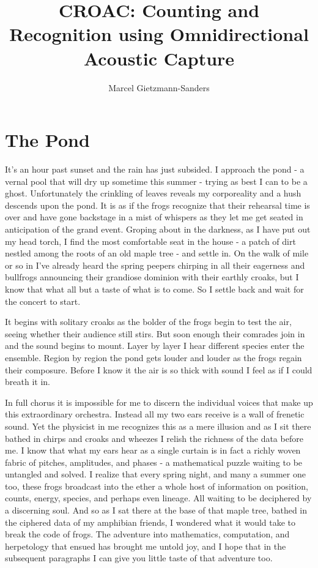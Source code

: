 \documentclass[10pt,a4paper]{article}
\title{CROAC: Counting and Recognition using Omnidirectional Acoustic Capture}
\author{Marcel Gietzmann-Sanders}
\begin{document}
\maketitle
\section{The Pond}
It's an hour past sunset and the rain has just subsided. I approach the pond - a vernal pool that will dry up sometime this summer - trying as best I can to be a ghost. Unfortunately the crinkling of leaves reveals my corporeality and a hush descends upon the pond. It is as if the frogs recognize that their rehearsal time is over and have gone backstage in a mist of whispers as they let me get seated in anticipation of the grand event. Groping about in the darkness, as I have put out my head torch, I find the most comfortable seat in the house - a patch of dirt nestled among the roots of an old maple tree - and settle in. On the walk of mile or so in I've already heard the spring peepers chirping in all their eagerness and bullfrogs announcing their grandiose dominion with their earthly croaks, but I know that what all but a taste of what is to come. So I settle back  and wait for the concert to start.

It begins with solitary croaks as the bolder of the frogs begin to test the air, seeing whether their audience still stirs. But soon enough their comrades join in and the sound begins to mount. Layer by layer I hear different species enter the ensemble. Region by region the pond gets louder and louder as the frogs regain their composure. Before I know it the air is so thick with sound I feel as if I could breath it in. 

In full chorus it is impossible for me to discern the individual voices that make up this extraordinary orchestra. Instead all my two ears receive is a wall of frenetic sound. Yet the physicist in me recognizes this as a mere illusion and as I sit there bathed in chirps and croaks and wheezes I relish the richness of the data before me. I know that what my ears hear as a single curtain is in fact a richly woven fabric of pitches, amplitudes, and phases - a mathematical puzzle waiting to be untangled and solved. I realize that every spring night, and many a summer one too, these frogs broadcast into the ether a whole host of information on position, counts, energy, species, and perhaps even lineage. All waiting to be deciphered by a discerning soul. And so as I sat there at the base of that maple tree, bathed in the ciphered data of my amphibian friends, I wondered what it would take to break the code of frogs. The adventure into mathematics, computation, and herpetology that ensued has brought me untold joy, and I hope that in the subsequent paragraphs I can give you little taste of that adventure too. 
\end{document}
